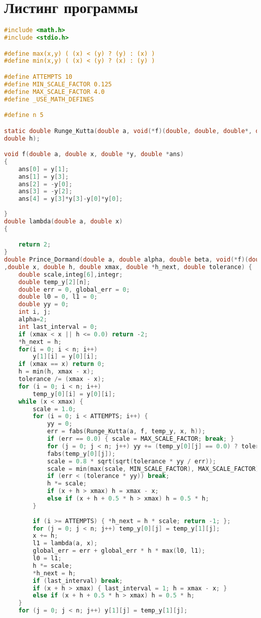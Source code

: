 \documentclass{article}
\theoremstyle{remark}
\theoremstyle{definition}
\begin{document}
	\section{Листинг программы}
	\begin{lstlisting}[language=C]
#include <math.h>
#include <stdio.h>

#define max(x,y) ( (x) < (y) ? (y) : (x) )
#define min(x,y) ( (x) < (y) ? (x) : (y) )

#define ATTEMPTS 10
#define MIN_SCALE_FACTOR 0.125
#define MAX_SCALE_FACTOR 4.0
#define _USE_MATH_DEFINES

#define n 5

static double Runge_Kutta(double a, void(*f)(double, double, double*, double*),  double y[][n], double x,
double h);

void f(double a, double x, double *y, double *ans)
{
    ans[0] = y[1];
    ans[1] = y[3];
    ans[2] = -y[0];
    ans[3] = -y[2];
    ans[4] = y[3]*y[3]-y[0]*y[0];
    
}
double lambda(double a, double x)
{

    return 2;
}
double Prince_Dormand(double a, double alpha, double beta, void(*f)(double, double, double*,double*),double(*lambda)(double, double x),double y[][n]
,double x, double h, double xmax, double *h_next, double tolerance) {
    double scale,integ[6],integr;
    double temp_y[2][n];
    double err = 0, global_err = 0;
    double l0 = 0, l1 = 0;
    double yy = 0;
    int i, j;
    alpha=2;
    int last_interval = 0;
    if (xmax < x || h <= 0.0) return -2;
    *h_next = h;
    for(i = 0; i < n; i++)
        y[1][i] = y[0][i];
    if (xmax == x) return 0;
    h = min(h, xmax - x);
    tolerance /= (xmax - x);
    for (i = 0; i < n; i++)
        temp_y[0][i] = y[0][i];
    while (x < xmax) {
        scale = 1.0;
        for (i = 0; i < ATTEMPTS; i++) {
            yy = 0;
            err = fabs(Runge_Kutta(a, f, temp_y, x, h));
            if (err == 0.0) { scale = MAX_SCALE_FACTOR; break; }
            for (j = 0; j < n; j++) yy += (temp_y[0][j] == 0.0) ? tolerance:
            fabs(temp_y[0][j]);
            scale = 0.8 * sqrt(sqrt(tolerance * yy / err));
            scale = min(max(scale, MIN_SCALE_FACTOR), MAX_SCALE_FACTOR);
            if (err < (tolerance * yy)) break;
            h *= scale;
            if (x + h > xmax) h = xmax - x;
            else if (x + h + 0.5 * h > xmax) h = 0.5 * h;
        }
        
        if (i >= ATTEMPTS) { *h_next = h * scale; return -1; };
        for (j = 0; j < n; j++) temp_y[0][j] = temp_y[1][j];
        x += h;
        l1 = lambda(a, x);
        global_err = err + global_err * h * max(l0, l1);
        l0 = l1;
        h *= scale;
        *h_next = h;
        if (last_interval) break;
        if (x + h > xmax) { last_interval = 1; h = xmax - x; }
        else if (x + h + 0.5 * h > xmax) h = 0.5 * h;
    }
    for (j = 0; j < n; j++) y[1][j] = temp_y[1][j];
    


\end{lstlisting}
\end{document}
